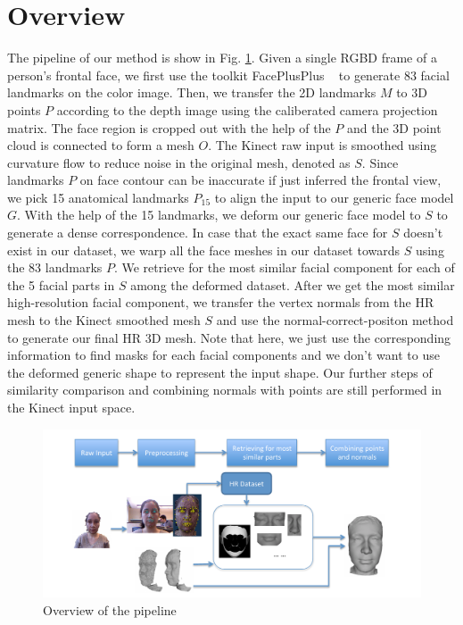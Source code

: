 \documentclass[annual]{acmsiggraph}
\begin{document}
\section{Overview}
The pipeline of our method is show in Fig. \ref{pipeline}. Given a single RGBD frame of a person's frontal face, we first use the toolkit FacePlusPlus ~\cite{face++} to generate 83 facial landmarks on the color image. Then, we transfer the 2D landmarks $M$ to 3D points $P$ according to the depth image using the caliberated camera projection matrix. The face region is cropped out with the help of the $P$ and the 3D point cloud is connected to form a mesh $O$. The Kinect raw input is smoothed using curvature flow to reduce noise in the original mesh, denoted as $S$. Since landmarks $P$ on face contour can be inaccurate if just inferred the frontal view, we pick 15 anatomical landmarks $P_{15}$ to align the input to our generic face model $G$. With the help of the 15 landmarks, we deform our generic face model to $S$ to generate a dense correspondence. In case that the exact same face for $S$ doesn't exist in our dataset, we warp all the face meshes in our dataset towards $S$ using the 83 landmarks $P$. We retrieve for the most similar facial component for each of the 5 facial parts in $S$ among the deformed dataset. After we get the most similar high-resolution facial component, we transfer the vertex normals from the HR mesh to the Kinect smoothed mesh $S$ and use the normal-correct-positon method to generate our final HR 3D mesh. Note that here, we just use the corresponding information to find masks for each facial components and we don't want to use the deformed generic shape to represent the input shape. Our further steps of similarity comparison and combining normals with points are still performed in the Kinect input space. 

\begin{figure}[htb]
  \centering
  \includegraphics[width=8in]{images/pipeline}
  \caption{Overview of the pipeline}\label{pipeline}
\end{figure}
\end{document}

